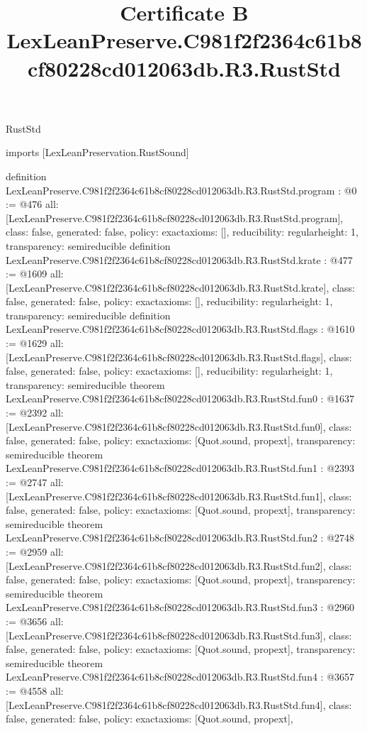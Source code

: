 \begin{lexlean}{RustStd}
\title{Certificate B LexLeanPreserve.C981f2f2364c61b8cf80228cd012063db.R3.RustStd}
\begin{coremodule}
imports [LexLeanPreservation.RustSound]

definition LexLeanPreserve.C981f2f2364c61b8cf80228cd012063db.R3.RustStd.program : @0 := @476 {
  all: [LexLeanPreserve.C981f2f2364c61b8cf80228cd012063db.R3.RustStd.program],
  class: false,
  generated: false,
  policy: exact{axioms: []},
  reducibility: regular{height: 1},
  transparency: semireducible
}
definition LexLeanPreserve.C981f2f2364c61b8cf80228cd012063db.R3.RustStd.krate : @477 := @1609 {
  all: [LexLeanPreserve.C981f2f2364c61b8cf80228cd012063db.R3.RustStd.krate],
  class: false,
  generated: false,
  policy: exact{axioms: []},
  reducibility: regular{height: 1},
  transparency: semireducible
}
definition LexLeanPreserve.C981f2f2364c61b8cf80228cd012063db.R3.RustStd.flags : @1610 := @1629 {
  all: [LexLeanPreserve.C981f2f2364c61b8cf80228cd012063db.R3.RustStd.flags],
  class: false,
  generated: false,
  policy: exact{axioms: []},
  reducibility: regular{height: 1},
  transparency: semireducible
}
theorem LexLeanPreserve.C981f2f2364c61b8cf80228cd012063db.R3.RustStd.fun0 : @1637 := @2392 {
  all: [LexLeanPreserve.C981f2f2364c61b8cf80228cd012063db.R3.RustStd.fun0],
  class: false,
  generated: false,
  policy: exact{axioms: [Quot.sound, propext]},
  transparency: semireducible
}
theorem LexLeanPreserve.C981f2f2364c61b8cf80228cd012063db.R3.RustStd.fun1 : @2393 := @2747 {
  all: [LexLeanPreserve.C981f2f2364c61b8cf80228cd012063db.R3.RustStd.fun1],
  class: false,
  generated: false,
  policy: exact{axioms: [Quot.sound, propext]},
  transparency: semireducible
}
theorem LexLeanPreserve.C981f2f2364c61b8cf80228cd012063db.R3.RustStd.fun2 : @2748 := @2959 {
  all: [LexLeanPreserve.C981f2f2364c61b8cf80228cd012063db.R3.RustStd.fun2],
  class: false,
  generated: false,
  policy: exact{axioms: [Quot.sound, propext]},
  transparency: semireducible
}
theorem LexLeanPreserve.C981f2f2364c61b8cf80228cd012063db.R3.RustStd.fun3 : @2960 := @3656 {
  all: [LexLeanPreserve.C981f2f2364c61b8cf80228cd012063db.R3.RustStd.fun3],
  class: false,
  generated: false,
  policy: exact{axioms: [Quot.sound, propext]},
  transparency: semireducible
}
theorem LexLeanPreserve.C981f2f2364c61b8cf80228cd012063db.R3.RustStd.fun4 : @3657 := @4558 {
  all: [LexLeanPreserve.C981f2f2364c61b8cf80228cd012063db.R3.RustStd.fun4],
  class: false,
  generated: false,
  policy: exact{axioms: [Quot.sound, propext]},
}
\end{coremodule}
\end{lexlean}
